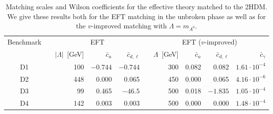 \begin{table}[b!]  \renewcommand{\arraystretch}{1.2} \centering
  \begin{tabular}{c c rrr c rrrr} \toprule \multirow{2}{*}{Benchmark}
&\hspace*{1em}& \multicolumn{3}{c}{EFT} &\hspace*{1em}&
\multicolumn{4}{c}{EFT ($v$-improved)} \\ \cmidrule{3-5}
\cmidrule{7-10} && $|\Lambda|$~[GeV] & $\bar{c}_u$ &
$\bar{c}_{d,\ell}$ && $\Lambda$~[GeV] & $\bar{c}_u$ &
$\bar{c}_{d,\ell}$ & $\bar{c}_\gamma$ \\ \midrule D1 && 100 & $-0.744$
& $-0.744$ && 300 & 0.082 & 0.082 & $1.61 \cdot 10^{-4}$ \\ D2 && 448
& 0.000 & 0.065 && 450 & 0.000 & 0.065 & $4.16 \cdot 10^{-6}$ \\ D3 &&
99 & 0.465 & $-46.5$ && 500 & 0.018 & $-1.835$ & $1.05 \cdot 10^{-4}$
\\ D4 && 142 & 0.003 & 0.003 && 500 & 0.000 & 0.000 & $1.48 \cdot
10^{-4}$ \\ \bottomrule
  \end{tabular}
 \caption{Matching scales and Wilson coefficients for the effective
theory matched to the 2HDM. We give these results both for the EFT
matching in the unbroken phase as well as for the $v$-improved
matching with $\Lambda = m_{A^0}$.}
 \label{tab:2hdm_EFT}
\end{table}

